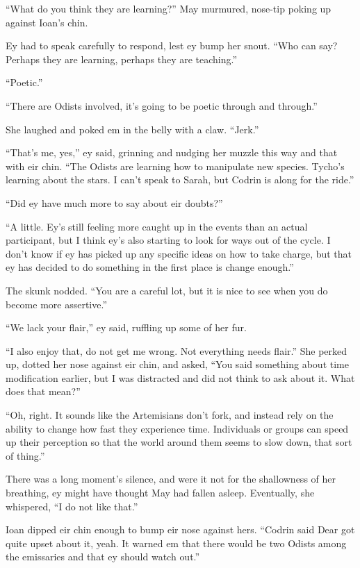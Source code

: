 ``What do you think they are learning?'' May murmured, nose-tip poking up against Ioan's chin.

Ey had to speak carefully to respond, lest ey bump her snout. ``Who can say? Perhaps they are learning, perhaps they are teaching.''

``Poetic.''

``There are Odists involved, it's going to be poetic through and through.''

She laughed and poked em in the belly with a claw. ``Jerk.''

``That's me, yes,'' ey said, grinning and nudging her muzzle this way and that with eir chin. ``The Odists are learning how to manipulate new species. Tycho's learning about the stars. I can't speak to Sarah, but Codrin is along for the ride.''

``Did ey have much more to say about eir doubts?''

``A little. Ey's still feeling more caught up in the events than an actual participant, but I think ey's also starting to look for ways out of the cycle. I don't know if ey has picked up any specific ideas on how to take charge, but that ey has decided to do something in the first place is change enough.''

The skunk nodded. ``You are a careful lot, but it is nice to see when you do become more assertive.''

``We lack your flair,'' ey said, ruffling up some of her fur.

``I also enjoy that, do not get me wrong. Not everything needs flair.'' She perked up, dotted her nose against eir chin, and asked, ``You said something about time modification earlier, but I was distracted and did not think to ask about it. What does that mean?''

``Oh, right. It sounds like the Artemisians don't fork, and instead rely on the ability to change how fast they experience time. Individuals or groups can speed up their perception so that the world around them seems to slow down, that sort of thing.''

There was a long moment's silence, and were it not for the shallowness of her breathing, ey might have thought May had fallen asleep. Eventually, she whispered, ``I do not like that.''

Ioan dipped eir chin enough to bump eir nose against hers. ``Codrin said Dear got quite upset about it, yeah. It warned em that there would be two Odists among the emissaries and that ey should watch out.''

